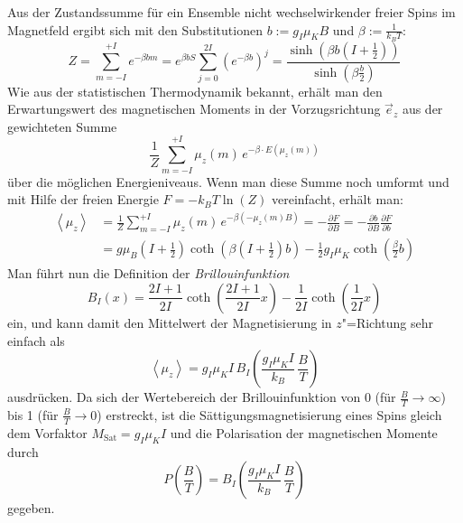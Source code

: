 Aus der Zustandssumme für ein Ensemble nicht wechselwirkender freier Spins im Magnetfeld ergibt
sich mit den Substitutionen $b:=g_I\mu_K B$ und $\beta:=\frac1{k_BT}$:
	\begin{equation}
		Z = \sum_{m=-I}^{+I}e^{-\beta bm} = e^{\beta bS}\sum_{j=0}^{2I}\left(e^{-\beta b}\right)^j = 
			\frac{\sinh\left(\beta b\left(I+\frac12\right)\right)}{\sinh\left(\beta \frac{b}2\right)}
	\end{equation}
Wie aus der statistischen Thermodynamik bekannt, erhält man den Erwartungswert des magnetischen
Moments in der Vorzugsrichtung $\vec e_z$ aus der gewichteten Summe
	\begin{equation}
		\frac1{Z}\sum_{m=-I}^{+I}\mu_z(m)\,e^{-\beta\cdot E(\mu_z(m))}
	\end{equation}
über die möglichen Energieniveaus. Wenn man
diese Summe noch umformt und mit Hilfe der freien Energie $F=-k_BT\ln(Z)$ vereinfacht, erhält
man:
	\begin{align}
		\left<\mu_z\right>&=\frac1{Z}\sum_{m=-I}^{+I}\mu_z(m)\,e^{-\beta(-\mu_z(m)B)}=
			-\frac{\partial F}{\partial B} = -\frac{\partial b}{\partial B}\frac{\partial F}{\partial b}\\
		&= g \mu_B\left(I+\frac12\right)\coth\left(\beta\left(I+\frac12\right)b\right)-\frac12g_I\mu_K\coth\left(\frac{\beta}2b\right)
	\end{align}
Man führt nun die Definition der \emph{Brillouinfunktion}
	\begin{equation}
		\label{eqn:brillouin}
		B_I(x) = \frac{2I+1}{2I}\coth\left(\frac{2I+1}{2I}x\right)-\frac1{2I}\coth\left(\frac1{2I}x\right)
	\end{equation}
ein, und kann damit den Mittelwert der Magnetisierung in $z$"=Richtung sehr einfach als
	\begin{equation}
		\left<\mu_z\right> = g_I\mu_KI\,B_I\left(\frac{g_I\mu_KI}{k_B}\,\frac{B}{T}\right)
	\end{equation}
ausdrücken. Da sich der Wertebereich der Brillouinfunktion von 0 (für
$\frac{B}{T}\rightarrow\infty$) bis 1 (für $\frac{B}{T}\rightarrow0$) erstreckt, ist die
Sättigungsmagnetisierung eines Spins gleich dem Vorfaktor $M_\mathrm{Sat}=g_I\mu_KI$
und die Polarisation der magnetischen Momente durch
	\begin{equation}
		\label{eqn:polarisation}
		P\left(\frac{B}{T}\right) = B_I\left(\frac{g_I\mu_KI}{k_B}\,\frac{B}{T}\right)
	\end{equation}
gegeben.

